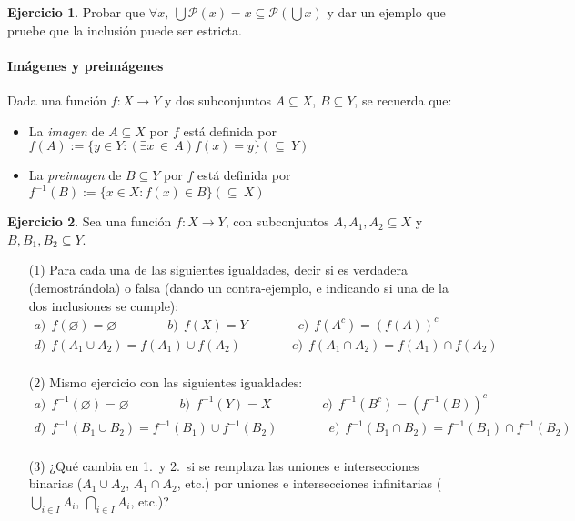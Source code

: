 \documentclass[a4paper,12pt]{book}
\def\ExIn#1#2{(\exists#1\,{\in}\,#2)}
\theoremstyle{definition}
\newtheorem{ejercicio}{Ejercicio}
\begin{document}
	\begin{ejercicio}
	Probar que $\forall x,~\bigcup \mathcal{P} (x)=x\subseteq \mathcal{P} (\bigcup x)$ y dar un ejemplo que pruebe que la inclusi\'on puede ser estricta. 
	\end{ejercicio}

	
	

	
		\paragraph*{Imágenes y preimágenes}
	Dada una función $f:X\to Y$ y dos subconjuntos
	$A\subseteq X$, $B\subseteq Y$, se recuerda que:
	\begin{itemize}\parskip-.5ex
		\item La \emph{imagen} de $A\subseteq X$ por $f$ está definida por\quad
		$f(A):=\{y\in Y:\ExIn{x}{A}f(x)=y\}$\hfill$({\subseteq}~Y)$
		\item La \emph{preimagen} de $B\subseteq Y$ por $f$ está definida por\quad
		$f^{-1}(B):=\{x\in X:f(x)\in B\}$\hfill $({\subseteq}~X)$
	\end{itemize}
	
	\begin{ejercicio}
	Sea una función $f:X\to Y$, con subconjuntos
	$A,A_1,A_2\subseteq X$ y $B,B_1,B_2\subseteq Y$.
	\begin{enumerate}\parskip-.5ex
		\item[(1)] Para cada una de las siguientes igualdades, decir si es
		verdadera (demostrándola) o falsa (dando un contra-ejemplo, e
		indicando si una de la dos inclusiones se cumple):
		$$\begin{array}{c}
			a)~~f(\varnothing)=\varnothing\qquad\qquad
			b)~~f(X)=Y\qquad\qquad c)~~f(A^c)=(f(A))^c\\[3pt]
			d)~~f(A_1\cup A_2)=f(A_1)\cup f(A_2)\qquad\qquad
			e)~~f(A_1\cap A_2)=f(A_1)\cap f(A_2)\\
		\end{array}$$
		\item[(2)] Mismo ejercicio con las siguientes igualdades:
		$$\begin{array}{c}
			a)~~f^{-1}(\varnothing)=\varnothing\qquad\qquad
			b)~~f^{-1}(Y)=X\qquad\qquad c)~~f^{-1}(B^c)=(f^{-1}(B))^c\\[3pt]
			d)~~f^{-1}(B_1\cup B_2)=f^{-1}(B_1)\cup f^{-1}(B_2)\qquad\qquad
			e)~~f^{-1}(B_1\cap B_2)=f^{-1}(B_1)\cap f^{-1}(B_2)\\
		\end{array}$$
		\item[(3)] ¿Qué cambia en 1.\ y 2.\ si se remplaza las uniones e
		intersecciones binarias ($A_1\cup A_2$, $A_1\cap A_2$, etc.) por
		uniones e intersecciones infinitarias ($\bigcup_{i\in I}A_i$,
		$\bigcap_{i\in I}A_i$, etc.)?
	\end{enumerate}
\end{ejercicio}
	
\end{document}

